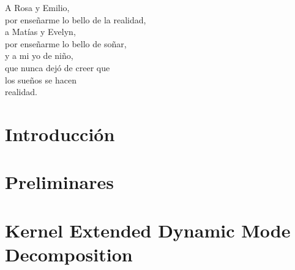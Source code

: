 \documentclass[
	spanish, %
	letterpaper, oneside
]{book}
\begin{document}
\templatePortrait

\templatePagecfg

\begin{abstractd}
	
\end{abstractd}

\begin{dedicatory}
    A Rosa y Emilio, \\
    por enseñarme lo bello de la realidad,\\
    a Matías y Evelyn, \\
    por enseñarme lo bello de soñar,\\
    y a mi yo de niño, \\
    que nunca dejó de creer que\\
    los sueños se hacen\\ 
    realidad.
\end{dedicatory}

\begin{acknowledgments}
	
\end{acknowledgments}

\templateIndex

\templateFinalcfg


\chapter{Introducción}


\chapter{Preliminares}


\chapter{Kernel Extended Dynamic Mode Decomposition}


\end{document}
